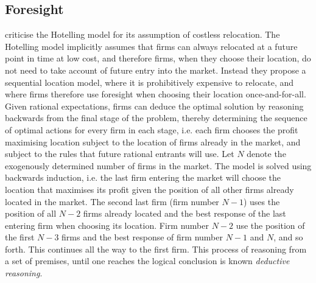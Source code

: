\documentclass[preprint, 12pt]{elsarticle}
\begin{document}
\subsection{Foresight}

\citet{Prescott_Visscher_1977} criticise the Hotelling model for its assumption of costless relocation. The Hotelling model implicitly assumes that firms can always relocated at a future point in time at low cost, and therefore firms, when they choose their location, do not need to take account of future entry into the market. Instead they propose a sequential location model, where it is prohibitively expensive to relocate, and where firms therefore use foresight when choosing their location once-and-for-all. Given rational expectations, firms can deduce the optimal solution by reasoning backwards from the final stage of the problem, thereby determining the sequence of optimal actions for every firm in each stage, i.e. each firm chooses the profit maximising location subject to the location of firms already in the market, and subject to the rules that future rational entrants will use. Let $N$ denote the exogenously determined number of firms in the market. The model is solved using backwards induction, i.e. the last firm entering the market will choose the location that maximises its profit given the position of all other firms already located in the market. The second last firm (firm number $N-1$) uses the position of all $N-2$ firms already located and the best response of the last entering firm when choosing its location. Firm number $N-2$ use the position of the first $N-3$ firms and the best response of firm number $N-1$ and $N$, and so forth. This continues all the way to the first firm. This process of reasoning from a set of premises, until one reaches the logical conclusion is known \emph{deductive reasoning}.
\end{document}

